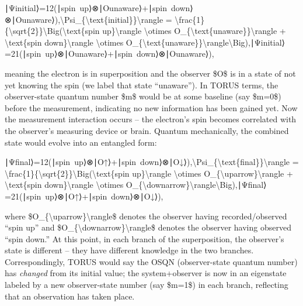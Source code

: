 \documentclass[
]{article}
\begin{document}
{∣Ψinitial⟩=12(∣spin~up⟩⊗∣Ounaware⟩+∣spin~down⟩⊗∣Ounaware⟩),\textbar\textbackslash Psi\_\{\textbackslash text\{initial\}\}\textbackslash rangle
=
\textbackslash frac\{1\}\{\textbackslash sqrt\{2\}\}\textbackslash Big(\textbar\textbackslash text\{spin
up\}\textbackslash rangle \textbackslash otimes
\textbar O\_\{\textbackslash text\{unaware\}\}\textbackslash rangle +
\textbar\textbackslash text\{spin down\}\textbackslash rangle
\textbackslash otimes
\textbar O\_\{\textbackslash text\{unaware\}\}\textbackslash rangle\textbackslash Big),∣Ψinitial\hspace{0pt}⟩=2\hspace{0pt}1\hspace{0pt}(∣spin~up⟩⊗∣Ounaware\hspace{0pt}⟩+∣spin~down⟩⊗∣Ounaware\hspace{0pt}⟩),

meaning the electron is in superposition and the observer \$O\$ is in a
state of not yet knowing the spin (we label that state
``unaware'')\hspace{0pt}. In TORUS terms, the observer-state quantum
number \$m\$ would be at some baseline (say \$m=0\$) before the
measurement, indicating no new information has been gained
yet\hspace{0pt}. Now the measurement interaction occurs -- the
electron's spin becomes correlated with the observer's measuring device
or brain. Quantum mechanically, the combined state would evolve into an
entangled form:

∣Ψfinal⟩=12(∣spin~up⟩⊗∣O↑⟩+∣spin~down⟩⊗∣O↓⟩),\textbar\textbackslash Psi\_\{\textbackslash text\{final\}\}\textbackslash rangle
=
\textbackslash frac\{1\}\{\textbackslash sqrt\{2\}\}\textbackslash Big(\textbar\textbackslash text\{spin
up\}\textbackslash rangle \textbackslash otimes
\textbar O\_\{\textbackslash uparrow\}\textbackslash rangle +
\textbar\textbackslash text\{spin down\}\textbackslash rangle
\textbackslash otimes
\textbar O\_\{\textbackslash downarrow\}\textbackslash rangle\textbackslash Big),∣Ψfinal\hspace{0pt}⟩=2\hspace{0pt}1\hspace{0pt}(∣spin~up⟩⊗∣O↑\hspace{0pt}⟩+∣spin~down⟩⊗∣O↓\hspace{0pt}⟩),

where \$\textbar O\_\{\textbackslash uparrow\}\textbackslash rangle\$
denotes the observer having recorded/observed ``spin up'' and
\$\textbar O\_\{\textbackslash downarrow\}\textbackslash rangle\$
denotes the observer having observed ``spin down.'' At this point, in
each branch of the superposition, the observer's state is different --
they have different knowledge in the two branches\hspace{0pt}.
Correspondingly, TORUS would say the OSQN (observer-state quantum
number) has \emph{changed} from its initial value; the system+observer
is now in an eigenstate labeled by a new observer-state number (say
\$m=1\$) in each branch, reflecting that an observation has taken
place\hspace{0pt}.

}
\end{document}
